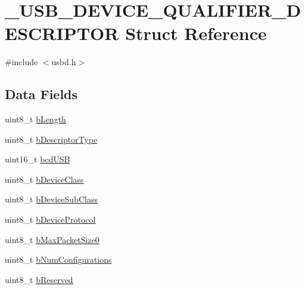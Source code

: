 \hypertarget{struct__USB__DEVICE__QUALIFIER__DESCRIPTOR}{\section{\-\_\-\-U\-S\-B\-\_\-\-D\-E\-V\-I\-C\-E\-\_\-\-Q\-U\-A\-L\-I\-F\-I\-E\-R\-\_\-\-D\-E\-S\-C\-R\-I\-P\-T\-O\-R Struct Reference}
\label{struct__USB__DEVICE__QUALIFIER__DESCRIPTOR}
}


{\ttfamily \#include $<$usbd.\-h$>$}

\subsection*{Data Fields}
\begin{DoxyCompactItemize}
\item 
uint8\-\_\-t \hyperlink{struct__USB__DEVICE__QUALIFIER__DESCRIPTOR_a48a7d7d23c8a44054246cabb6d61b784}{b\-Length}
\item 
uint8\-\_\-t \hyperlink{struct__USB__DEVICE__QUALIFIER__DESCRIPTOR_a2dbcdc73ca5a8b7ad93662fe9fe51f6a}{b\-Descriptor\-Type}
\item 
uint16\-\_\-t \hyperlink{struct__USB__DEVICE__QUALIFIER__DESCRIPTOR_a5ed7e66481d8d3a56ae6a9a673cb36ce}{bcd\-U\-S\-B}
\item 
uint8\-\_\-t \hyperlink{struct__USB__DEVICE__QUALIFIER__DESCRIPTOR_a535ab966fc5c44325c418d62936bd36f}{b\-Device\-Class}
\item 
uint8\-\_\-t \hyperlink{struct__USB__DEVICE__QUALIFIER__DESCRIPTOR_ad9f1b4ac2f91733fa2a7aaa59c83827d}{b\-Device\-Sub\-Class}
\item 
uint8\-\_\-t \hyperlink{struct__USB__DEVICE__QUALIFIER__DESCRIPTOR_a89f31d3447ba230c9286ef8b17d07d6a}{b\-Device\-Protocol}
\item 
uint8\-\_\-t \hyperlink{struct__USB__DEVICE__QUALIFIER__DESCRIPTOR_aa2d6b38e770b0309eab331a31b693f8b}{b\-Max\-Packet\-Size0}
\item 
uint8\-\_\-t \hyperlink{struct__USB__DEVICE__QUALIFIER__DESCRIPTOR_a12db8a81d507d7019204c54867e460fd}{b\-Num\-Configurations}
\item 
uint8\-\_\-t \hyperlink{struct__USB__DEVICE__QUALIFIER__DESCRIPTOR_a8d9c5ddf2a109289513b43ce1effb198}{b\-Reserved}
\end{DoxyCompactItemize}


